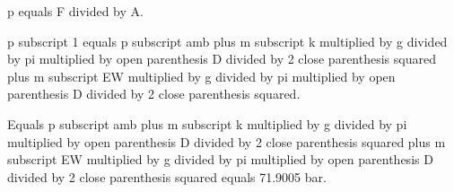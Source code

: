p equals F divided by A.  

p subscript 1 equals p subscript amb plus m subscript k multiplied by g divided by pi multiplied by open parenthesis D divided by 2 close parenthesis squared plus m subscript EW multiplied by g divided by pi multiplied by open parenthesis D divided by 2 close parenthesis squared.  

Equals p subscript amb plus m subscript k multiplied by g divided by pi multiplied by open parenthesis D divided by 2 close parenthesis squared plus m subscript EW multiplied by g divided by pi multiplied by open parenthesis D divided by 2 close parenthesis squared equals 71.9005 bar.